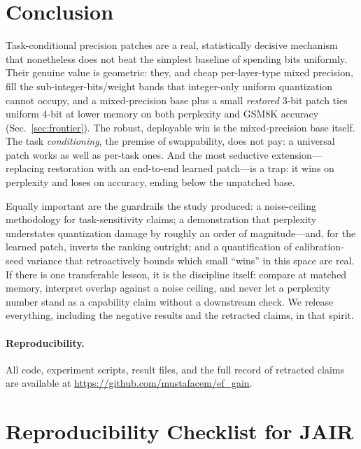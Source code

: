 \documentclass[manuscript, screen, review]{jair}
\newcommand{\bpw}{bits/weight}
\begin{document}
\section{Conclusion}
Task-conditional precision patches are a real, statistically decisive mechanism
that nonetheless does not beat the simplest baseline of spending bits
uniformly. Their genuine value is geometric: they, and cheap per-layer-type
mixed precision, fill the sub-integer-\bpw{} bands that integer-only uniform
quantization cannot occupy, and a mixed-precision base plus a small
\emph{restored} 3-bit patch ties uniform 4-bit at lower memory on both
perplexity and GSM8K accuracy (Sec.~\ref{sec:frontier}). The robust, deployable
win is the mixed-precision base itself. The task \emph{conditioning}, the
premise of swappability, does not pay: a universal patch works as well as
per-task ones. And the most seductive extension---replacing restoration with an
end-to-end learned patch---is a trap: it wins on perplexity and loses on
accuracy, ending below the unpatched base.

Equally important are the guardrails the study produced: a noise-ceiling
methodology for task-sensitivity claims; a demonstration that perplexity
understates quantization damage by roughly an order of magnitude---and, for the
learned patch, inverts the ranking outright; and a quantification of
calibration-seed variance that retroactively bounds which small ``wins'' in
this space are real. If there is one transferable lesson, it is the discipline
itself: compare at matched memory, interpret overlap against a noise ceiling,
and never let a perplexity number stand as a capability claim without a
downstream check. We release everything, including the negative results and the
retracted claims, in that spirit.

\paragraph{Reproducibility.} All code, experiment scripts, result files, and
the full record of retracted claims are available at
\url{https://github.com/mustafacem/ef_gain}.




\appendix

\section{Reproducibility Checklist for JAIR}
\end{document}
